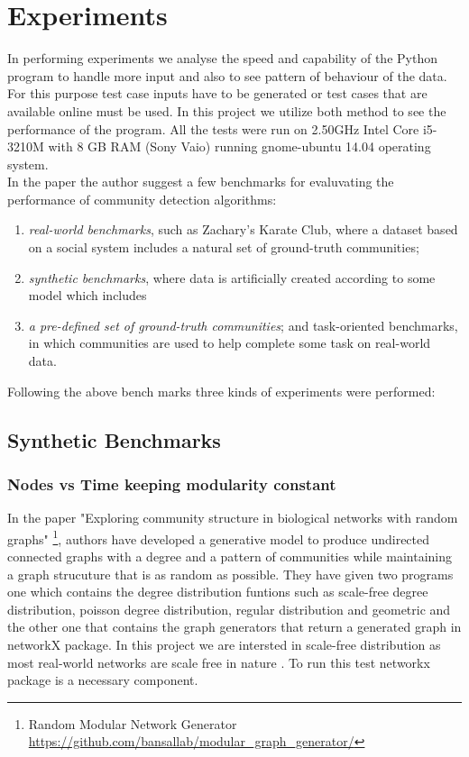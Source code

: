 \section{Experiments}
In performing experiments we analyse the speed and capability of the Python program to handle more input and also to see pattern of behaviour of the data. For this purpose test case inputs have to be generated or test cases that are available online must be used. 
In this project we utilize both method to see the performance of the program. All the tests were run on 2.50GHz Intel Core i5-3210M with 8 GB RAM (Sony Vaio) running gnome-ubuntu 14.04 operating system. 
\\
In the paper \cite{benchmarking} the author suggest a few benchmarks for evaluvating the performance of community detection algorithms:
\begin{enumerate}
\item \textit{real-world benchmarks}, such as Zachary’s Karate Club, where a dataset based on a social system
includes a natural set of ground-truth communities;
\item \textit{synthetic benchmarks}, where data is artificially created according to some model which includes
\item \textit{a pre-defined set of ground-truth communities}; and
task-oriented benchmarks, in which communities are used to help complete some task on real-world
data.
\end{enumerate}
Following the above bench marks three kinds of experiments were performed:
\subsection{Synthetic Benchmarks}
\subsubsection{Nodes vs Time keeping modularity constant}
\par In the paper "Exploring community structure in biological networks with random graphs" \cite{githubtest1} \footnote{Random Modular Network Generator \url{https://github.com/bansallab/modular_graph_generator/}}, authors have developed a generative model to produce undirected connected graphs with a degree and a pattern of communities while maintaining a graph strucuture that is as random as possible.  They have given two programs one which contains the degree distribution funtions such as scale-free degree  distribution, poisson degree distribution, regular distribution and geometric and the other one that contains the graph generators that return a generated graph in networkX package.  In this project we are intersted in scale-free distribution as most real-world networks are scale free in nature \cite{scalefree}. To run this test networkx package is a necessary component. 

